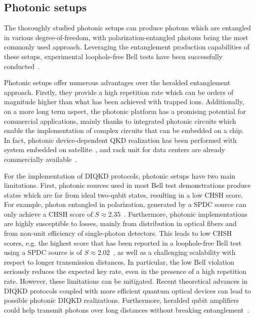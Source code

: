 \subsection{Photonic setups}

The thoroughly studied photonic setups can produce photons which are entangled in various degree-of-freedom, with polarization-entangled photons being the most commonly used approach.
Leveraging the entanglement production capabilities of these setups, experimental loophole-free Bell tests have been successfully conducted~\cite{Giustina2015,Shalm2015,Li2018}.

Photonic setups offer numerous advantages over the heralded entanglement approach.
Firstly, they provide a high repetition rate which can be orders of magnitude higher than what has been achieved with trapped ions.
Additionally, on a more long term aspect, the photonic platform has a promising potential for commercial applications, mainly thanks to integrated photonic circuits which enable the implementation of complex circuits that can be embedded on a chip.
In fact, photonic device-dependent QKD realization has been performed with system embedded on satellite~\cite{Liao2017}, and rack unit for data centers are already commercially available~\cite{Pljonkin2018}. 

For the implementation of DIQKD protocols, photonic setups have two main limitations.
First, photonic sources used in most Bell test demonstrations produce states which are far from ideal two-qubit states, resulting in a low CHSH score.
For example, photon entangled in polarization, generated by a SPDC source can only achieve a CHSH score of $S\approx 2.35$~\cite{Vivoli2015b}.
Furthermore, photonic implementations are highly susceptible to losses, mainly from distribution in optical fibers and from non-unit efficiency of single-photon detectors.
This leads to low CHSH scores, e.g. the highest score that has been reported in a loophole-free Bell test using a SPDC source is of $S \approx 2.02$~\cite{Liu2021}, as well as a challenging scalability with respect to longer transmission distances.
In particular, the low Bell violation seriously reduces the expected key rate, even in the presence of a high repetition rate.
However, these limitations can be mitigated.
Recent theoretical advances in DIQKD protocols coupled with more efficient quantum optical devices can lead to possible photonic DIQKD realizations.
Furthermore, heralded qubit amplifiers could help transmit photons over long distances without breaking entanglement~\cite{Gisin2010}.

